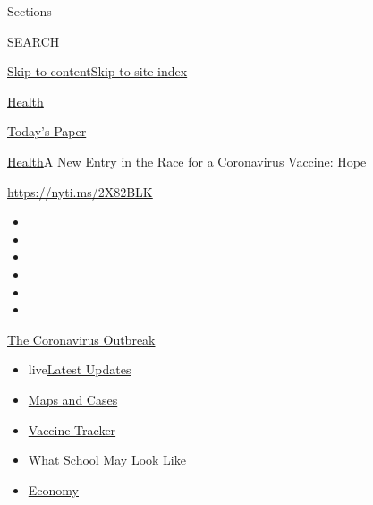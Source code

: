 Sections

SEARCH

\protect\hyperlink{site-content}{Skip to
content}\protect\hyperlink{site-index}{Skip to site index}

\href{https://www.nytimes.com/section/health}{Health}

\href{https://myaccount.nytimes.com/auth/login?response_type=cookie\&client_id=vi}{}

\href{https://www.nytimes.com/section/todayspaper}{Today's Paper}

\href{/section/health}{Health}\textbar{}A New Entry in the Race for a
Coronavirus Vaccine: Hope

\url{https://nyti.ms/2X82BLK}

\begin{itemize}
\item
\item
\item
\item
\item
\item
\end{itemize}

\href{https://www.nytimes.com/news-event/coronavirus?action=click\&pgtype=Article\&state=default\&region=TOP_BANNER\&context=storylines_menu}{The
Coronavirus Outbreak}

\begin{itemize}
\tightlist
\item
  live\href{https://www.nytimes.com/2020/08/02/world/coronavirus-updates.html?action=click\&pgtype=Article\&state=default\&region=TOP_BANNER\&context=storylines_menu}{Latest
  Updates}
\item
  \href{https://www.nytimes.com/interactive/2020/us/coronavirus-us-cases.html?action=click\&pgtype=Article\&state=default\&region=TOP_BANNER\&context=storylines_menu}{Maps
  and Cases}
\item
  \href{https://www.nytimes.com/interactive/2020/science/coronavirus-vaccine-tracker.html?action=click\&pgtype=Article\&state=default\&region=TOP_BANNER\&context=storylines_menu}{Vaccine
  Tracker}
\item
  \href{https://www.nytimes.com/interactive/2020/07/29/us/schools-reopening-coronavirus.html?action=click\&pgtype=Article\&state=default\&region=TOP_BANNER\&context=storylines_menu}{What
  School May Look Like}
\item
  \href{https://www.nytimes.com/live/2020/07/31/business/stock-market-today-coronavirus?action=click\&pgtype=Article\&state=default\&region=TOP_BANNER\&context=storylines_menu}{Economy}
\end{itemize}

